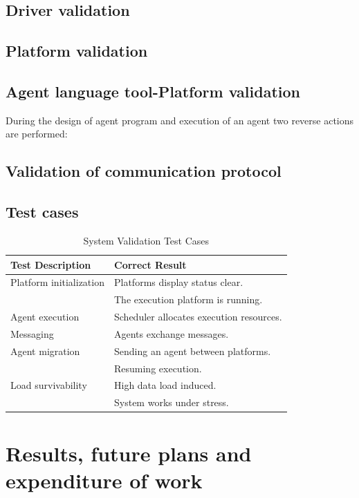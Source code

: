 \documentclass{scrreprt}
\begin{document}
\section{Driver validation}

\section{Platform validation}

\section{Agent language tool-Platform validation}

During the design of agent program and execution of an agent two reverse actions are performed:


\section{Validation of communication protocol}

\section{Test cases}

\vspace{0.2in}

\begin{table}
\begin{tabular}{|l|l|} \hline
  \textbf{Test Description} & \textbf{Correct Result} \\\hline
  Platform initialization & Platforms display status clear. \\
  & The execution platform is running.\\ \hline
  Agent execution & Scheduler allocates execution resources. \\ \hline
  Messaging & Agents exchange messages.\\ \hline
  Agent migration & Sending an agent between platforms. \\ 
  &  Resuming execution. \\ \hline
  Load survivability  & High data load induced. \\
  & System works under stress. \\ 
  \hline
\end{tabular}
\caption{System Validation Test Cases}
\end{table}

\chapter{Results, future plans and expenditure of work}
\end{document}
